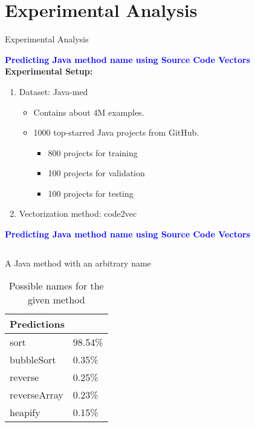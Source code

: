\section{Experimental Analysis}
\begin{frame}[allowframebreaks]{Experimental Analysis}

\textcolor{blue}{\textbf{Predicting Java method name using Source Code Vectors}}\\
\newline
\medskip
\textbf{Experimental Setup:}
\begin{enumerate}
    \item Dataset: Java-med \cite{alon2019code2vec}%
    \begin{itemize}
        \item Contains about 4M examples.
        \item 1000 top-starred Java projects from GitHub.
        \begin{itemize}
            \item 800 projects for training
            \item 100 projects for validation
            \item 100 projects for testing
        \end{itemize}
    \end{itemize}
    \item Vectorization method: code2vec \cite{alon2019code2vec}
\end{enumerate}
\framebreak

\textcolor{blue}{\textbf{Predicting Java method name using Source Code Vectors}}
\begin{minipage}{0.6\linewidth}
\begin{listing}[H]
    \inputminted[breaklines,fontsize=\footnotesize]{java}{impl.tex}
    \caption{A Java method with an arbitrary name}
    \label{lst:the-code}
\end{listing}
\end{minipage}
\hfill
\begin{minipage}{0.36\linewidth}
\begin{table}
\begin{center}
\caption{Possible names for the given method}
\begin{tabular}{ll}
    \multicolumn{2}{l}{Predictions} \\ \hline
    sort        & 98.54\% \\ \hline
    bubbleSort  & 0.35\% \\ \hline
    reverse     & 0.25\% \\ \hline
    reverseArray& 0.23\% \\ \hline
    heapify     & 0.15\% \\ \hline
\end{tabular}
\end{center}
\end{table}
\end{minipage}


\end{frame}